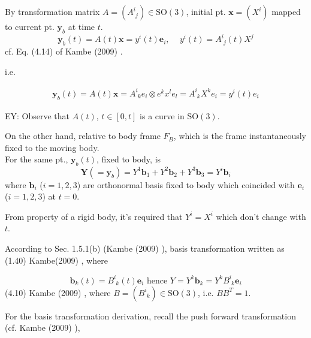 \documentclass[10pt]{amsart}
\begin{document}
\begin{multicols*}{2}
By transformation matrix $A = (A^i_{ \, \, j }) \in \text{SO}(3)$, initial pt. $\mathbf{x} = (X^i)$ mapped to current pt. $\mathbf{y}_b$ at time $t$.
\begin{equation}
\mathbf{y}_b(t) = A(t) \mathbf{x} = y^i (t) \mathbf{e}_i, \quad \, y^i(t) = A^i_{ \, \, j}(t)X^j
\end{equation}
cf. Eq. (4.14) of Kambe (2009) \cite{TKambe2009}.

i.e.

\[
\begin{gathered}
\mathbf{y}_b(t) = A(t) \mathbf{x} = A^i_{\,\, k} e_i \otimes e^k x^l e_l = A^i_{ \, \, k} X^k e_i = y^i(t) e_i
\end{gathered}
\]

EY: Observe that $A(t)$, $t\in [0,t]$ is a curve in $\text{SO}(3)$.

On the other hand, relative to body frame $F_B$, which is the frame instantaneously fixed to the moving body. \\
For the same pt., $\mathbf{y}_b(t)$, fixed to body, is
\[
\mathbf{Y}(=\mathbf{y}_b) = Y^1 \mathbf{b}_1 + Y^2 \mathbf{b}_2 + Y^3 \mathbf{b}_3 = Y^i \mathbf{b}_i
\]
where $\mathbf{b}_i$ ($i=1,2,3$) are orthonormal basis fixed to body which coincided with $\mathbf{e}_i$ ($i=1,2,3$) at $t=0$. 

From property of a rigid body, it's required that $Y^i = X^i$ which don't change with $t$.

According to Sec. 1.5.1(b) (Kambe (2009) \cite{TKambe2009}), basis transformation written as (1.40) Kambe(2009) \cite{TKambe2009}, where 

\begin{equation}
\mathbf{b}_k(t) = B^i_{ \, \, k}(t) \mathbf{e}_i \text{ hence } Y= Y^k \mathbf{b}_k = Y^k B^i_{ \, \, k} \mathbf{e}_i
\end{equation} 
(4.10) Kambe (2009) \cite{TKambe2009}, where $B = (B^i_{\, \, k}) \in \text{SO}(3)$, i.e. $BB^T = 1$.

For the basis transformation derivation, recall the push forward transformation (cf. Kambe (2009) \cite{TKambe2009}),


\end{multicols*}
\end{document}
